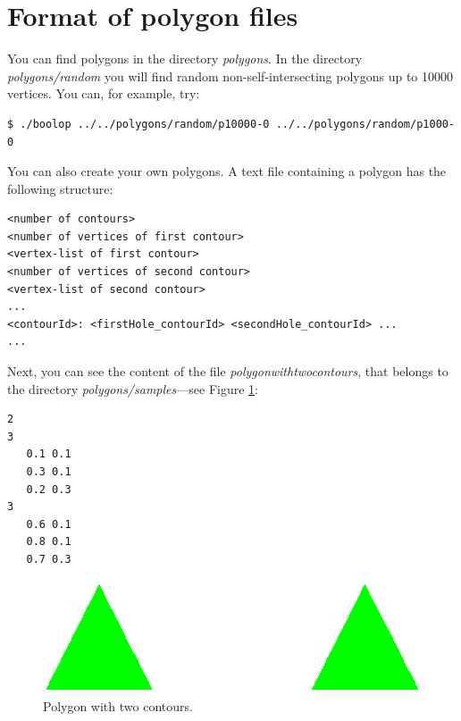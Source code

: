 \documentclass[a4paper]{article}
\begin{document}
%
%

\section{Format of polygon files}
You can find polygons in the directory \textit{polygons}. In the directory \textit{polygons/random} you will find random non-self-intersecting polygons 
up to 10000 vertices. You can, for example, try:

\begin{verbatim}
$ ./boolop ../../polygons/random/p10000-0 ../../polygons/random/p1000-0
\end{verbatim}

You can also create your own polygons. A text file containing a polygon has the following structure:

\begin{verbatim}
<number of contours>
<number of vertices of first contour>
<vertex-list of first contour>
<number of vertices of second contour>
<vertex-list of second contour>
...
<contourId>: <firstHole_contourId> <secondHole_contourId> ...
...
\end{verbatim}

Next, you can see the content of the file \textit{polygonwithtwocontours}, that belongs to the directory \textit{polygons/samples}---see 
Figure \ref{twocontours}:

\begin{verbatim}
2
3
   0.1 0.1
   0.3 0.1
   0.2 0.3
3
   0.6 0.1
   0.8 0.1
   0.7 0.3
\end{verbatim}

%
%
\begin{figure}
\centering
\includegraphics[scale=0.5]{twocontours.eps}
\caption{Polygon with two contours.}
\label{twocontours}
\end{figure}
\end{document}
